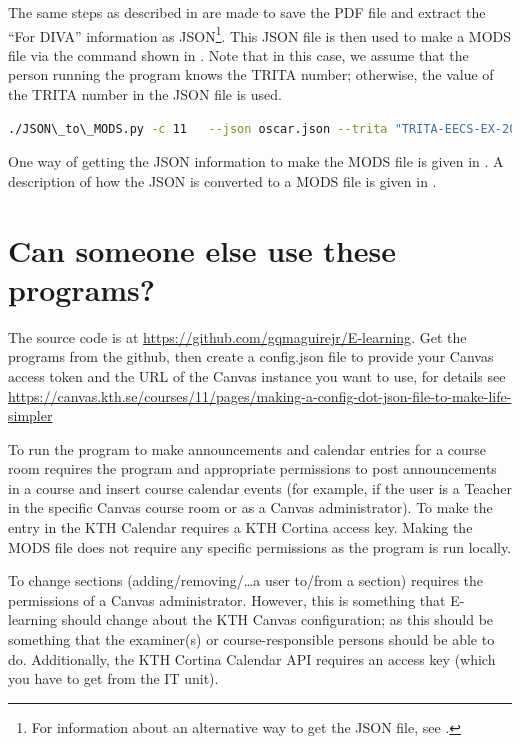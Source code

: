 The same steps as described in  are made to save the PDF file and extract the “For DIVA” information as JSON\footnote{For information about an alternative way to get the JSON file, see .}. This JSON file is then used to make a MODS file via the command shown in . Note that in this case, we assume that the person running the program knows the TRITA number; otherwise, the value of the TRITA number in the JSON file is used.
\begin{lstlisting}[language={bash}, caption={JSON\_to\_MODS.py for Oscar}, label=lst:jsonToMODSforOscar] 
./JSON\_to\_MODS.py -c 11   --json oscar.json --trita "TRITA-EECS-EX-2021:xxxx"
\end{lstlisting}

One way of getting the JSON information to make the MODS file is given in . A description of how the JSON is converted to a MODS file is given in .

\section{Can someone else use these programs?}
The source code is at \url{https://github.com/gqmaguirejr/E-learning}. Get the programs from the github, then create a config.json file to provide your Canvas access token and the URL of the Canvas instance you want to use, for details see \url{https://canvas.kth.se/courses/11/pages/making-a-config-dot-json-file-to-make-life-simpler} 

To run the program to make announcements and calendar entries for a course room requires the program and appropriate permissions  to post announcements in a course and insert course calendar events (for example, if the user is a Teacher in the specific Canvas course room or as a Canvas administrator). To make the entry in the KTH Calendar requires a KTH Cortina access key. Making the MODS file does not require any specific permissions as the program is run locally.

To change sections (adding/removing/\ldots a user to/from a section) requires the permissions of a Canvas administrator. However, this is something that E-learning should change about the KTH Canvas configuration; as this should be something that the examiner(s) or course-responsible persons should be able to do. Additionally, the KTH Cortina Calendar API requires an access key (which you have to get from the IT unit).

